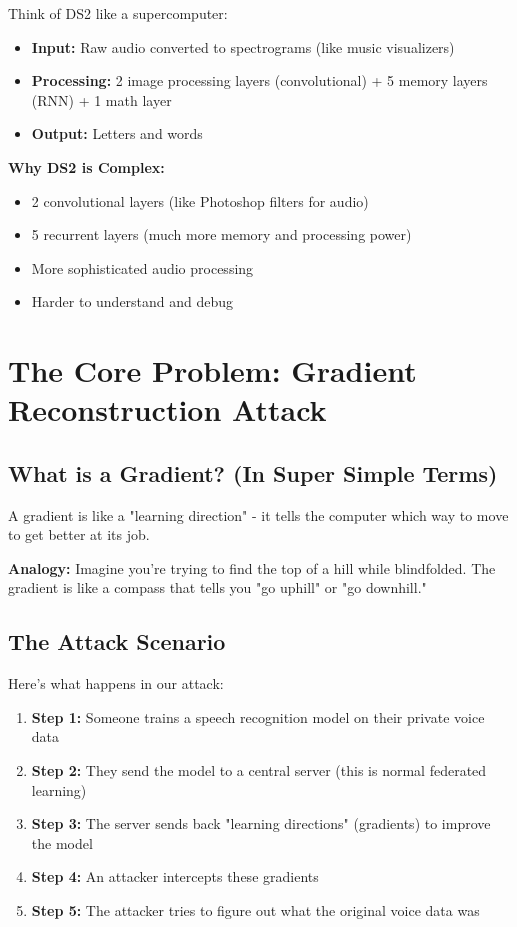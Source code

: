 \documentclass[12pt]{article}
\begin{document}
Think of DS2 like a supercomputer:
\begin{itemize}
    \item \textbf{Input:} Raw audio converted to spectrograms (like music visualizers)
    \item \textbf{Processing:} 2 image processing layers (convolutional) + 5 memory layers (RNN) + 1 math layer
    \item \textbf{Output:} Letters and words
\end{itemize}

\textbf{Why DS2 is Complex:}
\begin{itemize}
    \item 2 convolutional layers (like Photoshop filters for audio)
    \item 5 recurrent layers (much more memory and processing power)
    \item More sophisticated audio processing
    \item Harder to understand and debug
\end{itemize}

\section{The Core Problem: Gradient Reconstruction Attack}

\subsection{What is a Gradient? (In Super Simple Terms)}

A gradient is like a "learning direction" - it tells the computer which way to move to get better at its job.

\textbf{Analogy:} Imagine you're trying to find the top of a hill while blindfolded. The gradient is like a compass that tells you "go uphill" or "go downhill."

\subsection{The Attack Scenario}

Here's what happens in our attack:

\begin{enumerate}
    \item \textbf{Step 1:} Someone trains a speech recognition model on their private voice data
    \item \textbf{Step 2:} They send the model to a central server (this is normal federated learning)
    \item \textbf{Step 3:} The server sends back "learning directions" (gradients) to improve the model
    \item \textbf{Step 4:} An attacker intercepts these gradients
    \item \textbf{Step 5:} The attacker tries to figure out what the original voice data was
\end{enumerate}
\end{document}
